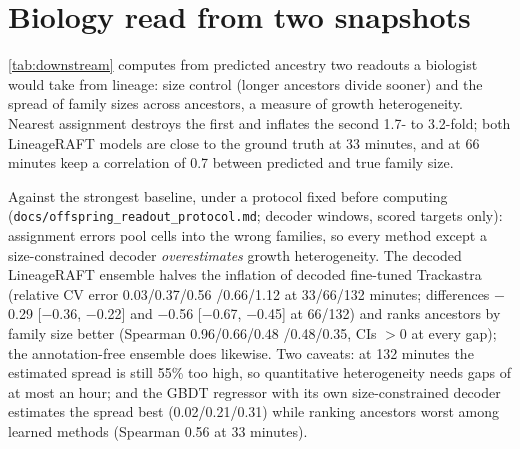 \documentclass[10pt,twocolumn,letterpaper]{article}
\newcommand{\ours}{LineageRAFT\xspace}
\begin{document}
\section{Biology read from two snapshots}
\cref{tab:downstream} computes from predicted ancestry two readouts a biologist would take from lineage: size control (longer ancestors divide sooner) and the spread of family sizes across ancestors, a measure of growth heterogeneity.
Nearest assignment destroys the first and inflates the second 1.7- to 3.2-fold; both \ours models are close to the ground truth at 33 minutes, and at 66 minutes keep a correlation of 0.7 between predicted and true family size.

Against the strongest baseline, under a protocol fixed before computing (\texttt{docs/offspring\_readout\_protocol.md}; decoder windows, scored targets only): assignment errors pool cells into the wrong families, so every method except a size-constrained decoder \emph{overestimates} growth heterogeneity.
The decoded \ours ensemble halves the inflation of decoded fine-tuned Trackastra (relative CV error 0.03/0.37/0.56 /0.66/1.12 at 33/66/132 minutes; differences $-$0.29 [$-$0.36, $-$0.22] and $-$0.56 [$-$0.67, $-$0.45] at 66/132) and ranks ancestors by family size better (Spearman 0.96/0.66/0.48 /0.48/0.35, CIs $>$0 at every gap); the annotation-free ensemble does likewise.
Two caveats: at 132 minutes the estimated spread is still 55\% too high, so quantitative heterogeneity needs gaps of at most an hour; and the GBDT regressor with its own size-constrained decoder estimates the spread best (0.02/0.21/0.31) while ranking ancestors worst among learned methods (Spearman 0.56 at 33 minutes).
\end{document}
